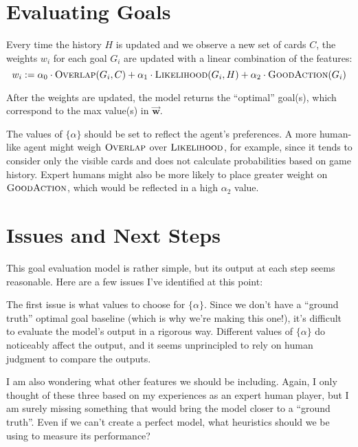 \documentclass[11pt]{article}
\newcommand{\bvec}[1]{\vec{\mathbf{#1}}}
\newcommand{\overlap}{\textsc{Overlap}}
\newcommand{\lkhd}{\textsc{Likelihood}}
\newcommand{\goodaction}{\textsc{GoodAction}}
\begin{document}
\section{Evaluating Goals}

Every time the history $H$ is updated and we observe a new set of cards $C$, the weights $w_i$ for each goal $G_i$ are updated with a linear combination of the features:
\begin{equation}
  w_i := \alpha_0 \cdot \overlap(G_i,C) + \alpha_1 \cdot \lkhd(G_i,H) + \alpha_2 \cdot \goodaction(G_i)
\label{eq:w-update} \end{equation}

After the weights are updated, the model returns the ``optimal'' goal(s), which correspond to the max value(s) in $\bvec{w}$.

The values of $\{\alpha\}$ should be set to reflect the agent's preferences. A more human-like agent might weigh $\overlap$ over $\lkhd$, for example, since it tends to consider only the visible cards and does not calculate probabilities based on game history. Expert humans might also be more likely to place greater weight on $\goodaction$, which would be reflected in a high $\alpha_2$ value.

\section{Issues and Next Steps}

This goal evaluation model is rather simple, but its output at each step seems reasonable. Here are a few issues I've identified at this point:

The first issue is what values to choose for $\{\alpha\}$. Since we don't have a ``ground truth'' optimal goal baseline (which is why we're making this one!), it's difficult to evaluate the model's output in a rigorous way. Different values of $\{\alpha\}$ do noticeably affect the output, and it seems unprincipled to rely on human judgment to compare the outputs.

I am also wondering what other features we should be including. Again, I only thought of these three based on my experiences as an expert human player, but I am surely missing something that would bring the model closer to a ``ground truth''. Even if we can't create a perfect model, what heuristics should we be using to measure its performance?

%
\end{document}

